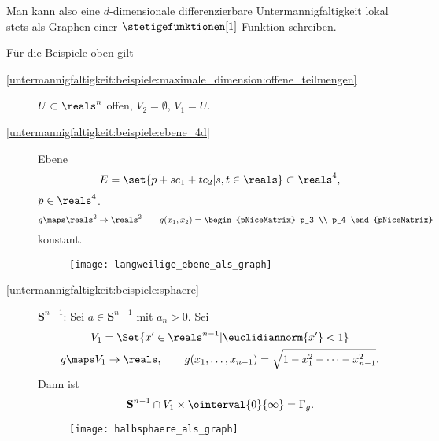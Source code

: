 \begin{bemerkung*}
  Man kann also eine \( d \)-dimensionale differenzierbare Untermannigfaltigkeit lokal stets als Graphen einer \( \stetigefunktionen[1] \)-Funktion schreiben.

  Für die Beispiele oben gilt
  \begin{description}
    \item[\ref{untermannigfaltigkeit:beispiele:maximale_dimension:offene_teilmengen}] \( U\subset \reals^n \) offen, \( V_2=\emptyset \), \( V_1=U \).
    \item[\ref{untermannigfaltigkeit:beispiele:ebene_4d}] Ebene
    \begin{equation*}
      E=\set{p+s e_1+t e_2|s,t\in \reals}\subset \reals^4,
    \end{equation*}
    \( p\in \reals^4 \).
    \begin{equation*}
      g\maps \reals^2\to \reals^2\qquad g(x_1,x_2)=\begin{pNiceMatrix} p_3 \\ p_4 \end{pNiceMatrix}
    \end{equation*}
    konstant.
    \begin{figure}[H]
      \centering
      \texttt{[image: langweilige\_ebene\_als\_graph]}
      \label{fig:langweilige_ebene_als_graph}
    \end{figure}
    \item[\ref{untermannigfaltigkeit:beispiele:sphaere}] \( \mathbf{S}^{n-1} \): Sei \( a\in \mathbf{S}^{n-1} \) mit \( a_n>0 \). Sei
    \begin{gather*}
      V_1=\Set{x'\in \reals^{n-1}|\euclidiannorm{x'}<1}\\
      g\maps V_1\to \reals,\qquad g(x_1,\dotsc,x_{n-1})=\sqrt{1-x_1^2-\dotsb-x_{n-1}^2}.
    \end{gather*}
    Dann ist
    \begin{equation*}
      \mathbf{S}^{n-1}\cap V_1\times \ointerval{0}{\infty}=\Gamma_g.
    \end{equation*}
    \begin{figure}[H]
      \centering
      \texttt{[image: halbsphaere\_als\_graph]}
      \label{fig:halbsphaere_als_graph}
    \end{figure}
  \end{description}
\end{bemerkung*}
